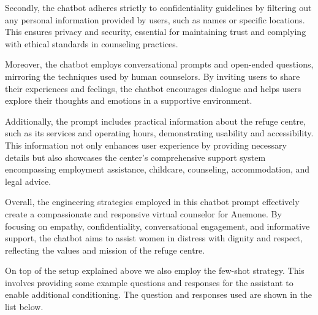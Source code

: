 Secondly, the chatbot adheres strictly to confidentiality guidelines by filtering out any personal information provided by users, such as names or specific locations. This ensures privacy and security, essential for maintaining trust and complying with ethical standards in counseling practices.

Moreover, the chatbot employs conversational prompts and open-ended questions, mirroring the techniques used by human counselors. By inviting users to share their experiences and feelings, the chatbot encourages dialogue and helps users explore their thoughts and emotions in a supportive environment.

Additionally, the prompt includes practical information about the refuge centre, such as its services and operating hours, demonstrating usability and accessibility. This information not only enhances user experience by providing necessary details but also showcases the center's comprehensive support system encompassing employment assistance, childcare, counseling, accommodation, and legal advice.

Overall, the engineering strategies employed in this chatbot prompt effectively create a compassionate and responsive virtual counselor for Anemone. By focusing on empathy, confidentiality, conversational engagement, and informative support, the chatbot aims to assist women in distress with dignity and respect, reflecting the values and mission of the refuge centre.

On top of the setup explained above we also employ the few-shot strategy. This involves providing some example questions and responses for the assistant to enable additional conditioning. 
The question and responses used are shown in the list below. 

